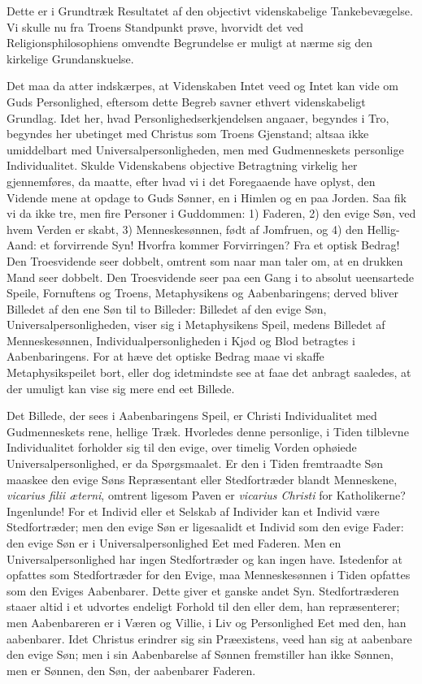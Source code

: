 \documentclass[12pt]{book}
\begin{document}
Dette er i Grundtræk Resultatet af den objectivt videnskabelige
Tankebevægelse. Vi skulle nu fra Troens Standpunkt prøve, hvorvidt
det ved Religionsphilosophiens omvendte Begrundelse er muligt at
nærme sig den kirkelige Grundanskuelse.

Det maa da atter indskærpes, at Videnskaben Intet veed og Intet kan
vide om Guds Personlighed, eftersom dette Begreb savner ethvert
videnskabeligt Grundlag. Idet her, hvad Personlighedserkjendelsen
angaaer, begyndes i Tro, begyndes her ubetinget med Christus som
Troens Gjenstand; altsaa ikke umiddelbart med Universalpersonligheden,
men med Gudmenneskets personlige Individualitet. Skulde Videnskabens
objective Betragtning virkelig her gjennemføres, da maatte, efter
hvad vi i det
Foregaaende have oplyst, den Vidende mene at opdage to Guds Sønner,
en i Himlen og en paa Jorden. Saa fik vi da ikke tre, men fire
Personer i Guddommen: 1) Faderen, 2) den evige Søn, ved hvem Verden
er skabt, 3) Menneskesønnen, født af Jomfruen, og 4) den
Hellig-Aand: et forvirrende Syn! Hvorfra kommer Forvirringen? Fra et
optisk Bedrag! Den Troesvidende seer dobbelt, omtrent som naar man
taler om, at en drukken Mand seer dobbelt. Den Troesvidende seer paa
een Gang i to absolut ueensartede Speile, Fornuftens og Troens,
Metaphysikens og Aabenbaringens; derved bliver Billedet af den ene
Søn til to Billeder: Billedet af den evige Søn,
Universalpersonligheden, viser sig i Metaphysikens Speil, medens
Billedet af Menneskesønnen, Individualpersonligheden i Kjød og Blod
betragtes i Aabenbaringens. For at hæve det optiske Bedrag maae vi
skaffe Metaphysikspeilet bort, eller dog idetmindste see at faae det
anbragt saaledes, at der umuligt kan vise sig mere end eet Billede.

Det Billede, der sees i Aabenbaringens Speil, er Christi
Individualitet med Gudmenneskets rene, hellige Træk. Hvorledes denne
personlige, i Tiden tilblevne Individualitet forholder sig til den
evige, over timelig Vorden ophøiede Universalpersonlighed, er da
Spørgsmaalet. Er den i Tiden fremtraadte Søn maaskee den evige Søns
Repræsentant eller Stedfortræder blandt Menneskene,
\textit{vicarius filii æterni}, omtrent ligesom Paven er
\textit{vicarius Christi} for Katholikerne? Ingenlunde! For et
Individ eller et Selskab af Individer kan et Individ være
Stedfortræder; men den evige Søn er ligesaalidt et Individ som den
evige Fader: den evige Søn er i Universalpersonlighed Eet med
Faderen. Men en Universalpersonlighed har ingen Stedfortræder og kan
ingen have. Istedenfor at opfattes som Stedfortræder for den Evige,
maa Menneskesønnen i Tiden opfattes som den Eviges
Aabenbarer. Dette giver et ganske andet Syn. Stedfortræderen staaer
altid i et udvortes endeligt Forhold til den eller dem, han
repræsenterer; men Aabenbareren er i Væren og Villie, i Liv og
Personlighed Eet med den, han aabenbarer. Idet Christus erindrer sig
sin Præexistens, veed han sig at aabenbare den evige Søn; men i sin
Aabenbarelse af Sønnen fremstiller han ikke Sønnen, men er Sønnen,
den Søn, der aabenbarer Faderen.
\end{document}

